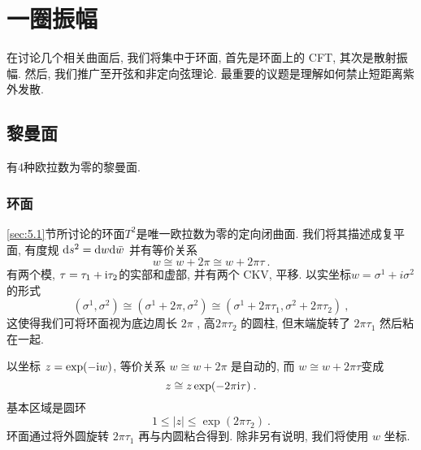 
\chapter{一圈振幅} \label{cha:7}
在讨论几个相关曲面后, 我们将集中于环面, 首先是环面上的 CFT, 其次是散射振幅. 然后, 我们推广至开弦和非定向弦理论. 最重要的议题是理解如何禁止短距离紫外发散.


\section{黎曼面} \label{sec:7.1}


有4种欧拉数为零的黎曼面.

\subsection*{环面}

\ref{sec:5.1}节所讨论的环面$T^{2}$是唯一欧拉数为零的定向闭曲面. 我们将其描述成复平面, 有度规 $\mathrm{d} s^{2}=\mathrm{d} w \mathrm{d} \bar{w}$ 并有等价关系
\begin{equation}
	w \cong w+2 \pi \cong w+2 \pi \tau \:. \label{7.1.1}
\end{equation}
有两个模, $\tau=\tau_{1}+\mathrm{i} \tau_{2}$的实部和虚部, 并有两个 CKV, 平移. 以实坐标$w=\sigma^{1}+i \sigma^{2}$的形式
\begin{equation}
	(\sigma^{1}, \sigma^{2}) \cong (\sigma^{1}+2 \pi, \sigma^{2}) \cong (\sigma^{1}+2 \pi \tau_{1}, \sigma^{2}+2 \pi \tau_{2}) \:, \label{7.1.2}
\end{equation}
这使得我们可将环面视为底边周长 $2 \pi$ , 高$2 \pi \tau_{2}$ 的圆柱, 但末端旋转了 $2 \pi \tau_{1}$ 然后粘在一起.

以坐标 $z=\exp (-\mathrm{i} w)$, 等价关系 $w \cong w+2 \pi$ 是自动的, 而 $w \cong w+2 \pi \tau$变成
\begin{equation}
	z \cong z \exp (-2 \pi \mathrm{i} \tau) \:. \label{7.1.3}
\end{equation}
基本区域是圆环
\begin{equation}
	1 \leq|z| \leq \exp (2 \pi \tau_{2}) \:. \label{7.1.4}
\end{equation}
环面通过将外圆旋转 $2 \pi \tau_{1}$ 再与内圆粘合得到. 除非另有说明, 我们将使用 $w$ 坐标.


